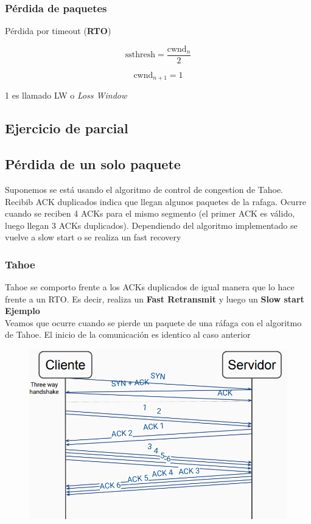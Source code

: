 \documentclass[titlepage,a4paper]{article}
\begin{document}
\subsubsection{Pérdida de paquetes}

Pérdida por timeout (\textbf{RTO})

$$ \mathrm{ssthresh} = \frac{\mathrm{cwnd}_n}{2} $$

$$ \mathrm{cwnd}_{n+1} = 1  $$

1 es llamado LW o \textit{Loss Window}

\subsection{Ejercicio de parcial}




\subsection{Pérdida de un solo paquete}

Suponemos se está usando el algoritmo de control de congestion de Tahoe. 
Recibib ACK duplicados indica que llegan algunos paquetes de la rafaga. Ocurre cuando se reciben 4 ACKs para el mismo segmento (el primer ACK es válido, luego llegan 3 ACKs duplicados). Dependiendo del algoritmo implementado se vuelve a slow start o se realiza un fast recovery

\subsubsection{Tahoe}

Tahoe se comporto frente a los ACKs duplicados de igual manera que lo hace frente a un RTO. Es decir, realiza un \textbf{Fast Retransmit} y luego un \textbf{Slow start} \\

\textbf{Ejemplo}\\

Veamos que ocurre cuando se pierde un paquete de una ráfaga con el algoritmo de Tahoe. El inicio de la comunicación es identico al caso anterior

\begin{figure}[H]
\centering
\includegraphics[width=\textwidth]{imagenes/resolucion2.png}
\end{figure}
\end{document}
